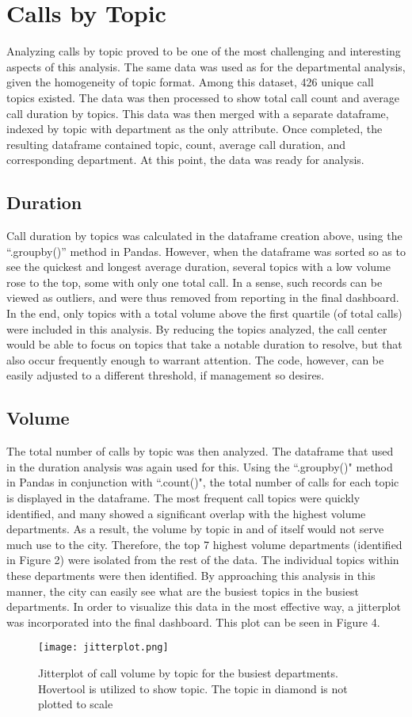 \documentclass[11pt,twocolumn]{article}
\begin{document}
\section{Calls by Topic}
Analyzing calls by topic proved to be one of the most challenging and interesting aspects of this analysis.  The same data was used as for the departmental analysis, given the homogeneity of topic format.  Among this dataset, 426 unique call topics existed.  The data was then processed to show total call count and average call duration by topics.  This data was then merged with a separate dataframe, indexed by topic with department as the only attribute.  Once completed, the resulting dataframe contained topic, count, average call duration, and corresponding department.  At this point, the data was ready for analysis.

\subsection{Duration}
Call duration by topics was calculated in the dataframe creation above, using the ``.groupby()'' method in Pandas.  However, when the dataframe was sorted so as to see the quickest and longest average duration, several topics with a low volume rose to the top, some with only one total call.  In a sense, such records can be viewed as outliers, and were thus removed from reporting in the final dashboard.  In the end, only topics with a total volume above the first quartile (of total calls) were included in this analysis.  By reducing the topics analyzed, the call center would be able to focus on topics that take a notable duration to resolve, but that also occur frequently enough to warrant attention.  The code, however, can be easily adjusted to a different threshold, if management so desires.

\subsection{Volume}
The total number of calls by topic was then analyzed.  The dataframe that used in the duration analysis was again used for this.  Using the ``.groupby()" method in Pandas in conjunction with ``.count()", the total number of calls for each topic is displayed in the dataframe.  The most frequent call topics were quickly identified, and many showed a significant overlap with the highest volume departments.  As a result, the volume by topic in and of itself would not serve much use to the city.  Therefore, the top 7 highest volume departments (identified in Figure 2) were isolated from the rest of the data.  The individual topics within these departments were then identified.  By approaching this analysis in this manner, the city can easily see what are the busiest topics in the busiest departments.  In order to visualize this data in the most effective way, a jitterplot was incorporated into the final dashboard.  This plot can be seen in Figure 4.
\begin{figure}[h]
  \texttt{[image: jitterplot.png]}
  \caption{Jitterplot of call volume by topic for the busiest departments.  Hovertool is utilized to show topic.  The topic in diamond is not plotted to scale}
\end{figure}
\end{document}
